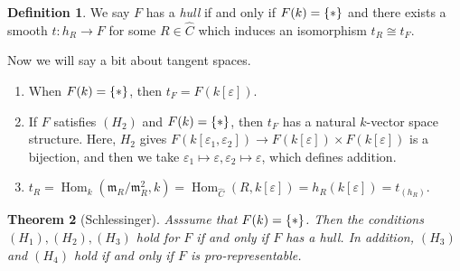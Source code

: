 \documentclass[leqno, openany]{memoir}
\newtheorem{thm}{Theorem}[section]
\theoremstyle{definition}
\newtheorem{defn}[thm]{Definition}
\theoremstyle{remark}
\theoremstyle{plain}
\theoremstyle{definition}
\theoremstyle{remark}
\newcommand{\ep}{\varepsilon}
\newcommand{\mf}[1]{\mathfrak{#1}}
\newcommand{\wh}[1]{\widehat{#1}}
\DeclareMathOperator{\Hom}{Hom}
\begin{document}
\begin{defn}
    We say $F$ has a \textit{hull} if and only if $F(k) = \qty{*}$ and there exists a smooth $t \colon h_R \to F$ for some $R \in \wh{C}$ which induces an isomorphism $t_R \cong t_F$.
\end{defn}

Now we will say a bit about tangent spaces.
\begin{enumerate}
    \item When $F(k) = \qty{*}$, then $t_F = F(k[\ep])$.
    \item If $F$ satisfies $(H_2)$ and $F(k) = \qty{*}$, then $t_F$ has a natural $k$-vector space structure. Here, $H_2$ gives $F(k[\ep_1, \ep_2]) \to F(k[\ep]) \times F(k[\ep])$ is a bijection, and then we take $\ep_1 \mapsto \ep, \ep_2 \mapsto \ep$, which defines addition.
    \item $t_R = \Hom_k(\mf{m}_R / \mf{m}_R^2, k) = \Hom_{\wh{C}}(R, k[\ep]) = h_R(k[\ep]) = t_{(h_R)}$.
\end{enumerate}

\begin{thm}[Schlessinger]
    Asssume that $F(k) = \qty{*}$. Then the conditions $(H_1), (H_2), (H_3)$ hold for $F$ if and only if $F$ has a hull. In addition, $(H_3)$ and $(H_4)$ hold if and only if $F$ is pro-representable.
\end{thm}
\end{document}
